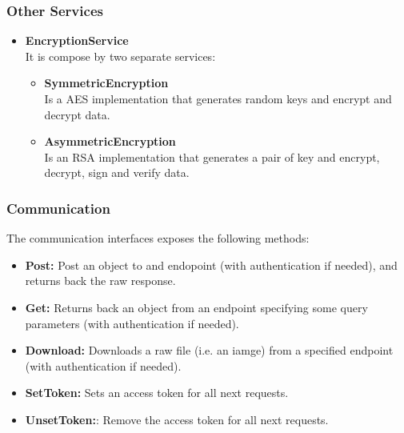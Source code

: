 \documentclass{article}
\begin{document}
\subsubsection{Other Services}
\label{sec:services}
\begin{itemize}
    	    \item \textbf{EncryptionService} \\ It is compose by two separate services:
			\begin{itemize}
				\item \textbf{SymmetricEncryption} \\
					Is a AES implementation that generates random keys and encrypt and decrypt data.
				\item \textbf{AsymmetricEncryption} \\
					Is an RSA implementation that generates a pair of key and encrypt, decrypt, sign and verify data.
			\end{itemize}
\end{itemize}

\subsubsection{Communication}
\label{sec:communication}
The communication interfaces exposes the following methods:
\begin{itemize}
    	    \item \textbf{ Post:} Post an object to and endopoint (with authentication if needed), and returns back the raw response.
	        \item \textbf{ Get:} Returns back an object from an endpoint specifying some query parameters (with authentication if needed).
	        \item \textbf{ Download:} Downloads a raw file (i.e. an iamge) from a specified endpoint (with authentication if needed).
	        \item \textbf{ SetToken:} Sets an access token for all next requests.
	        \item \textbf{ UnsetToken:}: Remove the access token for all next requests.
\end{itemize}
\end{document}
